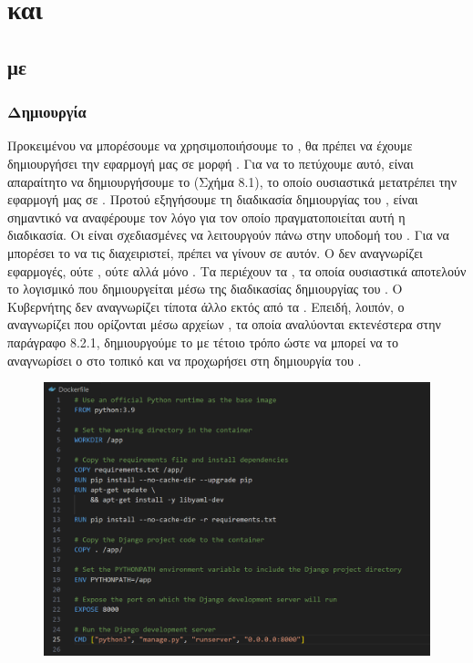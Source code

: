 \chapter{ και  }

\section{ με }

\subsection{Δημιουργία }

Προκειμένου να μπορέσουμε να χρησιμοποιήσουμε το , θα πρέπει να έχουμε δημιουργήσει την εφαρμογή μας σε μορφή . Για να το πετύχουμε αυτό, είναι απαραίτητο να δημιουργήσουμε το (Σχήμα 8.1), το οποίο ουσιαστικά μετατρέπει την εφαρμογή μας σε .
Προτού εξηγήσουμε τη διαδικασία δημιουργίας του , είναι σημαντικό να αναφέρουμε τον λόγο για τον οποίο πραγματοποιείται αυτή η διαδικασία. Οι  είναι σχεδιασμένες να λειτουργούν πάνω στην υποδομή του . Για να μπορέσει το  να τις διαχειριστεί, πρέπει να γίνουν  σε αυτόν.
Ο  δεν αναγνωρίζει εφαρμογές, ούτε , ούτε  αλλά μόνο . Τα  περιέχουν τα , τα οποία ουσιαστικά αποτελούν το λογισμικό που δημιουργείται μέσω της διαδικασίας δημιουργίας του . Ο Κυβερνήτης δεν αναγνωρίζει τίποτα άλλο εκτός από τα . Επειδή, λοιπόν, ο  αναγνωρίζει  που ορίζονται μέσω αρχείων , τα οποία αναλύονται εκτενέστερα στην παράγραφο 8.2.1, δημιουργούμε το  με τέτοιο τρόπο ώστε να μπορεί να το αναγνωρίσει ο  στο τοπικό  και να προχωρήσει στη δημιουργία του .


\begin{figure}[htb]
	\centering
	\includegraphics[width=1.5\textwidth]{graphics/dockerfile.png}
	\caption{}
\end{figure}


